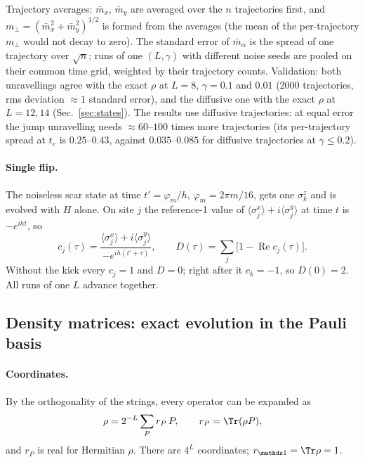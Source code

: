 Trajectory averages: $\bar m_x$, $\bar m_y$ are averaged over the $n$ trajectories first, and $m_\perp = (\bar m_x^2 + \bar m_y^2)^{1/2}$ is formed from the averages (the mean of the per-trajectory $m_\perp$ would not decay to zero). The standard error of $\bar m_\alpha$ is the spread of one trajectory over $\sqrt n$; runs of one $(L, \gamma)$ with different noise seeds are pooled on their common time grid, weighted by their trajectory counts. Validation: both unravellings agree with the exact $\rho$ at $L = 8$, $\gamma = 0.1$ and $0.01$ (2000 trajectories, rms deviation $\approx 1$ standard error), and the diffusive one with the exact $\rho$ at $L = 12, 14$ (Sec.~\ref{sec:states}). The results use diffusive trajectories: at equal error the jump unravelling needs $\approx 60$--$100$ times more trajectories (its per-trajectory spread at $t_e$ is $0.25$--$0.43$, against $0.035$--$0.085$ for diffusive trajectories at $\gamma \le 0.2$).

\paragraph{Single flip.} The noiseless scar state at time $t' = \varphi_m/h$, $\varphi_m = 2\pi m/16$, gets one $\sigma^z_k$ and is evolved with $H$ alone. On site $j$ the reference-1 value of $\langle\sigma^x_j\rangle + i\langle\sigma^y_j\rangle$ at time $t$ is $-e^{iht}$, so
\begin{equation}
c_j(\tau) = \frac{\langle\sigma^x_j\rangle + i\langle\sigma^y_j\rangle}{-e^{ih(t'+\tau)}}, \qquad D(\tau) = \sum_j\big[1 - \operatorname{Re}c_j(\tau)\big].
\end{equation}
Without the kick every $c_j = 1$ and $D = 0$; right after it $c_k = -1$, so $D(0) = 2$. All runs of one $L$ advance together.

\subsection{Density matrices: exact evolution in the Pauli basis}

\paragraph{Coordinates.} By the orthogonality of the strings, every operator can be expanded as
\begin{equation}
\rho = 2^{-L}\sum_P r_P\,P, \qquad r_P = \Tr(\rho P),
\end{equation}
and $r_P$ is real for Hermitian $\rho$. There are $4^L$ coordinates; $r_{\mathds 1} = \Tr\rho = 1$.

